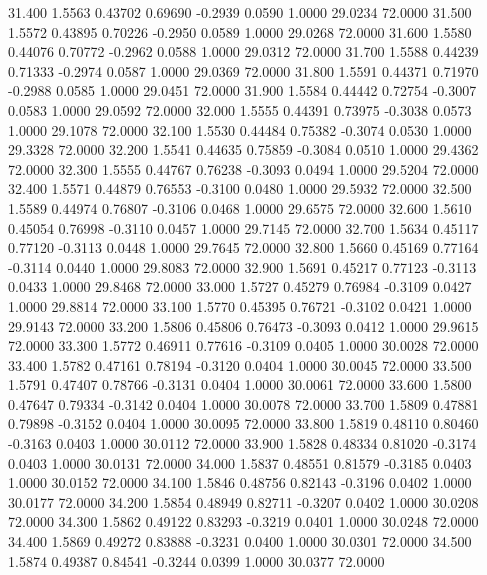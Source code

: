   31.400   1.5563   0.43702   0.69690  -0.2939   0.0590   1.0000  29.0234  72.0000
  31.500   1.5572   0.43895   0.70226  -0.2950   0.0589   1.0000  29.0268  72.0000
  31.600   1.5580   0.44076   0.70772  -0.2962   0.0588   1.0000  29.0312  72.0000
  31.700   1.5588   0.44239   0.71333  -0.2974   0.0587   1.0000  29.0369  72.0000
  31.800   1.5591   0.44371   0.71970  -0.2988   0.0585   1.0000  29.0451  72.0000
  31.900   1.5584   0.44442   0.72754  -0.3007   0.0583   1.0000  29.0592  72.0000
  32.000   1.5555   0.44391   0.73975  -0.3038   0.0573   1.0000  29.1078  72.0000
  32.100   1.5530   0.44484   0.75382  -0.3074   0.0530   1.0000  29.3328  72.0000
  32.200   1.5541   0.44635   0.75859  -0.3084   0.0510   1.0000  29.4362  72.0000
  32.300   1.5555   0.44767   0.76238  -0.3093   0.0494   1.0000  29.5204  72.0000
  32.400   1.5571   0.44879   0.76553  -0.3100   0.0480   1.0000  29.5932  72.0000
  32.500   1.5589   0.44974   0.76807  -0.3106   0.0468   1.0000  29.6575  72.0000
  32.600   1.5610   0.45054   0.76998  -0.3110   0.0457   1.0000  29.7145  72.0000
  32.700   1.5634   0.45117   0.77120  -0.3113   0.0448   1.0000  29.7645  72.0000
  32.800   1.5660   0.45169   0.77164  -0.3114   0.0440   1.0000  29.8083  72.0000
  32.900   1.5691   0.45217   0.77123  -0.3113   0.0433   1.0000  29.8468  72.0000
  33.000   1.5727   0.45279   0.76984  -0.3109   0.0427   1.0000  29.8814  72.0000
  33.100   1.5770   0.45395   0.76721  -0.3102   0.0421   1.0000  29.9143  72.0000
  33.200   1.5806   0.45806   0.76473  -0.3093   0.0412   1.0000  29.9615  72.0000
  33.300   1.5772   0.46911   0.77616  -0.3109   0.0405   1.0000  30.0028  72.0000
  33.400   1.5782   0.47161   0.78194  -0.3120   0.0404   1.0000  30.0045  72.0000
  33.500   1.5791   0.47407   0.78766  -0.3131   0.0404   1.0000  30.0061  72.0000
  33.600   1.5800   0.47647   0.79334  -0.3142   0.0404   1.0000  30.0078  72.0000
  33.700   1.5809   0.47881   0.79898  -0.3152   0.0404   1.0000  30.0095  72.0000
  33.800   1.5819   0.48110   0.80460  -0.3163   0.0403   1.0000  30.0112  72.0000
  33.900   1.5828   0.48334   0.81020  -0.3174   0.0403   1.0000  30.0131  72.0000
  34.000   1.5837   0.48551   0.81579  -0.3185   0.0403   1.0000  30.0152  72.0000
  34.100   1.5846   0.48756   0.82143  -0.3196   0.0402   1.0000  30.0177  72.0000
  34.200   1.5854   0.48949   0.82711  -0.3207   0.0402   1.0000  30.0208  72.0000
  34.300   1.5862   0.49122   0.83293  -0.3219   0.0401   1.0000  30.0248  72.0000
  34.400   1.5869   0.49272   0.83888  -0.3231   0.0400   1.0000  30.0301  72.0000
  34.500   1.5874   0.49387   0.84541  -0.3244   0.0399   1.0000  30.0377  72.0000
